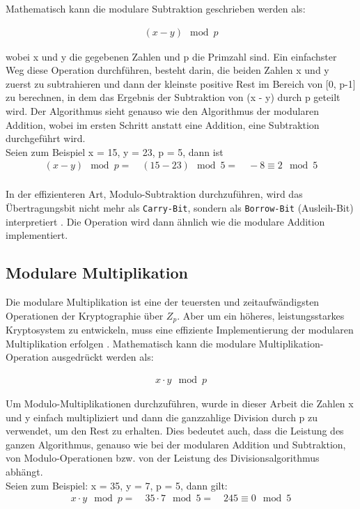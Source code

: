 Mathematisch kann die modulare Subtraktion geschrieben
werden als: 
\begin{ceqn}
\begin{align*}
                     (x - y) \mod p 
\end{align*}
\end{ceqn} 

wobei x und y die gegebenen Zahlen und p die Primzahl sind. 
Ein einfachster Weg diese Operation durchführen, besteht darin, die beiden Zahlen x
und y zuerst zu subtrahieren und dann der kleinste positive Rest im Bereich von [0, p-1] zu berechnen, in dem das Ergebnis
der Subtraktion von (x - y) durch p geteilt wird. Der Algorithmus sieht genauso wie den Algorithmus der modularen Addition, wobei im ersten Schritt anstatt eine Addition, eine Subtraktion durchgeführt wird. \\

Seien zum Beispiel x = 15, y = 23, p = 5, dann ist
\begin{align*}
    (x - y) \mod p = \quad (15-23) \mod 5 = \quad -8 \equiv 2 \mod 5 \\
\end{align*}

In der effizienteren Art, Modulo-Subtraktion durchzuführen, wird das Übertragungsbit nicht mehr als \texttt{Carry-Bit}, sondern als \texttt{Borrow-Bit} (Ausleih-Bit) interpretiert \cite{nist}. Die Operation wird dann ähnlich wie die modulare Addition implementiert.  

\subsection{Modulare Multiplikation}


Die modulare Multiplikation ist eine der teuersten und zeitaufwändigsten
Operationen der Kryptographie über $ Z_p$. Aber um ein höheres, leistungsstarkes Kryptosystem zu entwickeln,
muss eine effiziente Implementierung der modularen Multiplikation erfolgen \cite{Hossain2019}. 
Mathematisch kann die modulare Multiplikation-Operation ausgedrückt werden als:

\begin{ceqn}

\begin{align*}
           x \cdot y \mod p
\end{align*} 

\end{ceqn}

Um Modulo-Multiplikationen durchzuführen, wurde in dieser Arbeit die Zahlen x und y einfach multipliziert und dann die ganzzahlige Division durch p zu verwendet, um den Rest zu erhalten.
Dies bedeutet auch, dass die Leistung des ganzen Algorithmus, genauso wie bei der modularen Addition und Subtraktion, von Modulo-Operationen bzw. von der Leistung des Divisionsalgorithmus abhängt. \\
Seien zum Beispiel: x = 35, y = 7, p = 5, dann gilt:
\begin{align*}
    x \cdot y \mod p = \quad 35 \cdot 7 \mod 5 = \quad 245 \equiv 0 \mod 5 \\
\end{align*}

